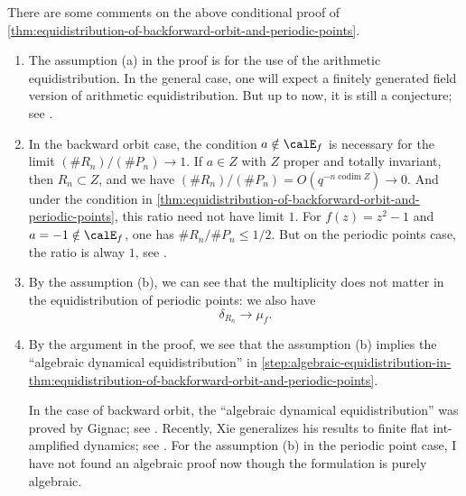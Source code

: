 \begin{remark}[label=\labelNFM{rmk:comments-on-the-proof-of-dynamical-distribution-by-arithmetic-distribution}, status=draft, tag=0000000]
	There are some comments on the above conditional proof of \cref{thm:equidistribution-of-backforward-orbit-and-periodic-points}.
	\begin{enumerate}
		\item The assumption (a) in the proof is for the use of the arithmetic equidistribution.
		      In the general case, one will expect a finitely generated field version of arithmetic equidistribution.
		      But up to now, it is still a conjecture; see \cite[Conjecture 5.4.1]{Yuan-Zhang-2026-AdelicLineBundles}.
		\item In the backward orbit case, the condition $a \notin \calE_f$ is necessary for the limit $(\# R_n)/(\# P_n)\to 1$.
		      If $a \in Z$ with $Z$ proper and totally invariant, then $R_n \subset Z$, and we have $(\# R_n)/(\# P_n) = O(q^{-n\operatorname{codim} Z}) \to 0$.
		      And under the condition in \cref{thm:equidistribution-of-backforward-orbit-and-periodic-points}, this ratio need not have limit $1$.
		      For $f(z) = z^2-1$ and $a = -1 \notin \calE_f$, one has $\#R_n/\#P_n \leq 1/2$.
		      But on the periodic points case, the ratio is alway $1$, see \cite[Corollary 1.3]{Dinh-Zhong-2023-PeriodicPointsMeromorphic}.
		\item By the assumption (b), we can see that the multiplicity does not matter in the equidistribution of periodic points: we also have
		      \[ \delta_{R_n} \to \mu_f. \]
		\item By the argument in the proof, we see that the assumption (b) implies the ``algebraic dynamical equidistribution'' in \cref{step:algebraic-equidistribution-in-thm:equidistribution-of-backforward-orbit-and-periodic-points}.

		      In the case of backward orbit, the ``algebraic dynamical equidistribution'' was proved by Gignac; see \cite[Theorem 5.1]{Gignac-2014-EquidistributionPreimagesNonarchimedean}.
		      Recently, Xie generalizes his results to finite flat int-amplified dynamics; see \cite[Theorem 1.23]{Xie-2023-RemarksAlgebraicDynamics}.
		      For the assumption (b) in the periodic point case, I have not found an algebraic proof now though the formulation is purely algebraic.
	\end{enumerate}

\end{remark}





















